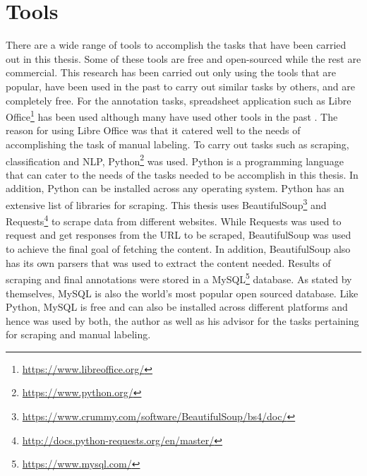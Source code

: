 \documentclass[a4paper,12pt,twoside]{report}
\begin{document}
\section{Tools}
There are a wide range of tools to accomplish the tasks that have been carried out in this thesis. Some of these tools are free and open-sourced while the rest are commercial. This research has been carried out only using the tools that are popular, have been used in the past to carry out similar tasks by others, and are completely free. 
\newline \newline
For the annotation tasks, spreadsheet application such as Libre Office\footnote{\url{https://www.libreoffice.org/}} has been used although many have used other tools in the past \cite{Lata2016}\cite{Nonnenmacher2017}. The reason for using Libre Office was that it catered well to the needs of accomplishing the task of manual labeling. 
\newline \newline
To carry out tasks such as scraping, classification and \acs{NLP}, Python\footnote{\url{https://www.python.org/}} was used. Python is a programming language that can cater to the needs of the tasks needed to be accomplish in this thesis. In addition, Python can be installed across any operating system. Python has an extensive list of libraries for scraping. This thesis uses BeautifulSoup\footnote{\url{https://www.crummy.com/software/BeautifulSoup/bs4/doc/}} and Requests\footnote{\url{http://docs.python-requests.org/en/master/}} to scrape data from different websites. While Requests was used to request and get responses from the URL to be scraped, BeautifulSoup was used to achieve the final goal of fetching the content. In addition, BeautifulSoup also has its own parsers that was used to extract the content needed.
\newline \newline
Results of scraping and final annotations were stored in a MySQL\footnote{\url{https://www.mysql.com/}} database. As stated by themselves, MySQL is also the world's most popular open sourced database. Like Python, MySQL is free and can also be installed across different platforms and hence was used by both, the author as well as his advisor for the tasks pertaining for scraping and manual labeling. 
\newline \newline
\end{document}
